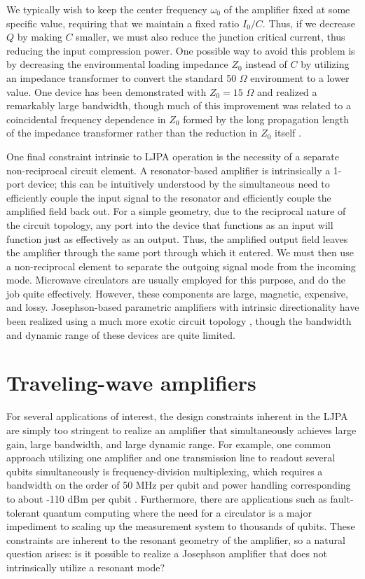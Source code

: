 We typically wish to keep the center frequency $\omega_0$ of the amplifier fixed at some specific value, requiring that we maintain a fixed ratio $I_0 / C$.  Thus, if we decrease $Q$ by making $C$ smaller, we must also reduce the junction critical current, thus reducing the input compression power.  One possible way to avoid this problem is by decreasing the environmental loading impedance $Z_0$ instead of $C$ by utilizing an impedance transformer to convert the standard 50 $\Omega$ environment to a lower value.  One device has been demonstrated with $Z_0 = 15$ $\Omega$ and realized a remarkably large bandwidth, though much of this improvement was related to a coincidental frequency dependence in $Z_0$ formed by the long propagation length of the impedance transformer rather than the reduction in $Z_0$ itself \cite{Mutus2014}.

One final constraint intrinsic to LJPA operation is the necessity of a separate non-reciprocal circuit element.  A resonator-based amplifier is intrinsically a 1-port device; this can be intuitively understood by the simultaneous need to efficiently couple the input signal to the resonator and efficiently couple the amplified field back out.  For a simple geometry, due to the reciprocal nature of the circuit topology, any port into the device that functions as an input will function just as effectively as an output.  Thus, the amplified output field leaves the amplifier through the same port through which it entered.  We must then use a non-reciprocal element to separate the outgoing signal mode from the incoming mode.  Microwave circulators are usually employed for this purpose, and do the job quite effectively.  However, these components are large, magnetic, expensive, and lossy.  Josephson-based parametric amplifiers with intrinsic directionality have been realized using a much more exotic circuit topology \cite{Abdo2014}, though the bandwidth and dynamic range of these devices are quite limited.

\section{Traveling-wave amplifiers}

For several applications of interest, the design constraints inherent in the LJPA are simply too stringent to realize an amplifier that simultaneously achieves large gain, large bandwidth, and large dynamic range.  For example, one common approach utilizing one amplifier and one transmission line to readout several qubits simultaneously is frequency-division multiplexing, which requires a bandwidth on the order of 50 MHz per qubit and power handling corresponding to about -110 dBm per qubit \cite{Barends2014,Riste2014}.  Furthermore, there are applications such as fault-tolerant quantum computing where the need for a circulator is a major impediment to scaling up the measurement system to thousands of qubits.  These constraints are inherent to the resonant geometry of the amplifier, so a natural question arises: is it possible to realize a Josephson amplifier that does not intrinsically utilize a resonant mode?

